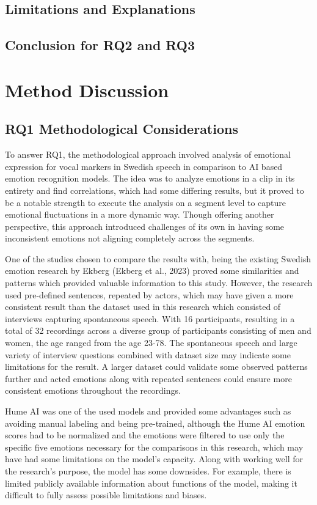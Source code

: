 \subsection{Limitations and Explanations}
\subsection{Conclusion for RQ2 and RQ3}

\section{Method Discussion}

\subsection{RQ1 Methodological Considerations}
To answer RQ1, the methodological approach involved analysis of emotional expression for vocal markers in Swedish speech in comparison to AI based emotion recognition models. The idea was to analyze emotions in a clip in its entirety and find correlations, which had some differing results, but it proved to be a notable strength to execute the analysis on a segment level to capture emotional fluctuations in a more dynamic way. Though offering another perspective, this approach introduced challenges of its own in having some inconsistent emotions not aligning completely across the segments.

One of the studies chosen to compare the results with, being the existing Swedish emotion research by Ekberg (Ekberg et al., 2023) proved some similarities and patterns which provided valuable information to this study.  However, the research used pre-defined sentences, repeated by actors, which may have given a more consistent result than the dataset used in this research which consisted of interviews capturing spontaneous speech. With 16 participants, resulting in a total of 32 recordings across a diverse group of participants consisting of men and women, the age ranged from the age 23-78. The spontaneous speech and large variety of interview questions combined with dataset size may indicate some limitations for the result. A larger dataset could validate some observed patterns further and acted emotions along with repeated sentences could ensure more consistent emotions throughout the recordings.

Hume AI was one of the used models and provided some advantages such as avoiding manual labeling and being pre-trained, although the Hume AI emotion scores had to be normalized and the emotions were filtered to use only the specific five emotions necessary for the comparisons in this research, which may have had some limitations on the model’s capacity. Along with working well for the research’s purpose, the model has some downsides. For example, there is limited publicly available information about functions of the model, making it difficult to fully assess possible limitations and biases.

